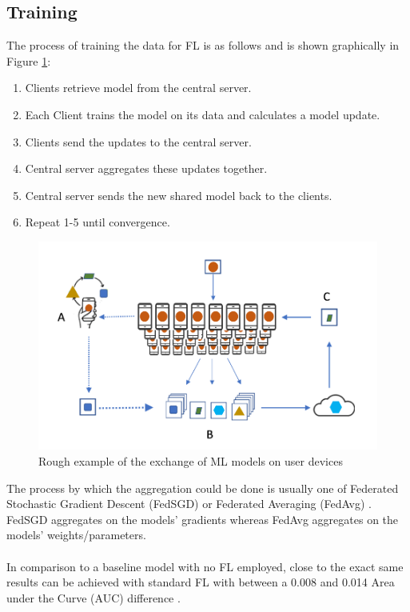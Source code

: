 \subsection{Training}
The process of training the data for FL is as follows and is shown graphically in Figure \ref{fig:federated_learning}:
\begin{enumerate}
    \item Clients retrieve model from the central server.
    
    \item Each Client trains the model on its data and calculates a model update.
    
    \item Clients send the updates to the central server.
    
    \item Central server aggregates these updates together.
    
    \item Central server sends the new shared model back to the clients.
    
    \item Repeat 1-5 until convergence.
\end{enumerate}
\begin{figure}[htbp]
	\centering
    \includegraphics[scale=0.3]{background/federated_learning.png}
	\caption{Rough example of the exchange of ML models on user devices \cite{federated_learning}}
	\label{fig:federated_learning}
\end{figure}
The process by which the aggregation could be done is usually one of Federated Stochastic Gradient Descent (FedSGD) \cite{fedsgd} or Federated Averaging (FedAvg) \cite{fedavg}.
FedSGD aggregates on the models' gradients whereas FedAvg aggregates on the models' weights/parameters. \\ \\
In comparison to a baseline model with no FL employed, close to the exact same results can be achieved with standard FL with between a 0.008 and 0.014 Area under the Curve (AUC) difference \cite{babu}.



